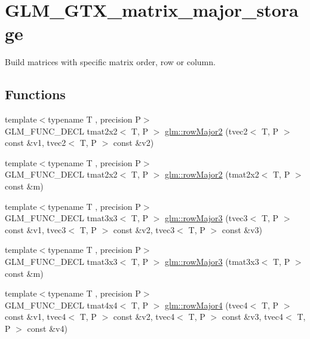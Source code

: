\hypertarget{group__gtx__matrix__major__storage}{\section{G\-L\-M\-\_\-\-G\-T\-X\-\_\-matrix\-\_\-major\-\_\-storage}
\label{group__gtx__matrix__major__storage}
}


Build matrices with specific matrix order, row or column.  


\subsection*{Functions}
\begin{DoxyCompactItemize}
\item 
{\footnotesize template$<$typename T , precision P$>$ }\\G\-L\-M\-\_\-\-F\-U\-N\-C\-\_\-\-D\-E\-C\-L tmat2x2$<$ T, P $>$ \hyperlink{group__gtx__matrix__major__storage_ga0c7f4d56a85865f0002127119ab7d551}{glm\-::row\-Major2} (tvec2$<$ T, P $>$ const \&v1, tvec2$<$ T, P $>$ const \&v2)
\item 
{\footnotesize template$<$typename T , precision P$>$ }\\G\-L\-M\-\_\-\-F\-U\-N\-C\-\_\-\-D\-E\-C\-L tmat2x2$<$ T, P $>$ \hyperlink{group__gtx__matrix__major__storage_ga42a006aa66198452bd3c89415f892196}{glm\-::row\-Major2} (tmat2x2$<$ T, P $>$ const \&m)
\item 
{\footnotesize template$<$typename T , precision P$>$ }\\G\-L\-M\-\_\-\-F\-U\-N\-C\-\_\-\-D\-E\-C\-L tmat3x3$<$ T, P $>$ \hyperlink{group__gtx__matrix__major__storage_gaba4de9afc4e65ec8ea0403e7cba3fb9f}{glm\-::row\-Major3} (tvec3$<$ T, P $>$ const \&v1, tvec3$<$ T, P $>$ const \&v2, tvec3$<$ T, P $>$ const \&v3)
\item 
{\footnotesize template$<$typename T , precision P$>$ }\\G\-L\-M\-\_\-\-F\-U\-N\-C\-\_\-\-D\-E\-C\-L tmat3x3$<$ T, P $>$ \hyperlink{group__gtx__matrix__major__storage_ga38537061135b55e7a053926ca55e6e20}{glm\-::row\-Major3} (tmat3x3$<$ T, P $>$ const \&m)
\item 
{\footnotesize template$<$typename T , precision P$>$ }\\G\-L\-M\-\_\-\-F\-U\-N\-C\-\_\-\-D\-E\-C\-L tmat4x4$<$ T, P $>$ \hyperlink{group__gtx__matrix__major__storage_ga3ce8f2a78fb2f15bf28151ee128b0ae8}{glm\-::row\-Major4} (tvec4$<$ T, P $>$ const \&v1, tvec4$<$ T, P $>$ const \&v2, tvec4$<$ T, P $>$ const \&v3, tvec4$<$ T, P $>$ const \&v4)

\end{DoxyCompactItemize}
